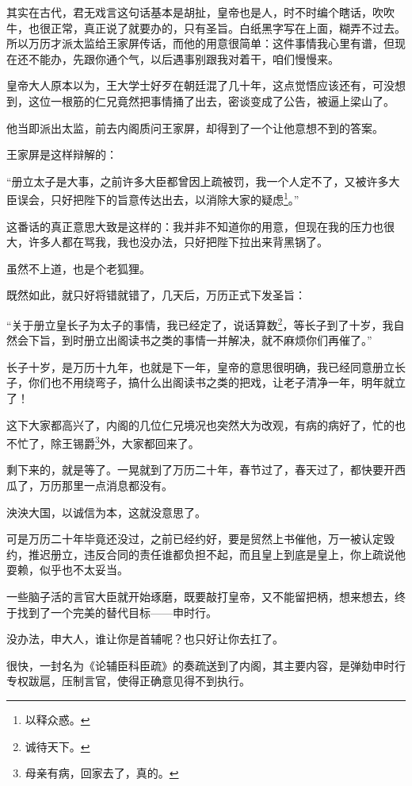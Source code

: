 \begin{multicols}{\theparacolNo}
		其实在古代，君无戏言这句话基本是胡扯，皇帝也是人，时不时编个瞎话，吹吹牛，也很正常，真正说了就要办的，只有圣旨。白纸黑字写在上面，糊弄不过去。所以万历才派太监给王家屏传话，而他的用意很简单：这件事情我心里有谱，但现在还不能办，先跟你通个气，以后遇事别跟我对着干，咱们慢慢来。

		皇帝大人原本以为，王大学士好歹在朝廷混了几十年，这点觉悟应该还有，可没想到，这位一根筋的仁兄竟然把事情捅了出去，密谈变成了公告，被逼上梁山了。

		他当即派出太监，前去内阁质问王家屏，却得到了一个让他意想不到的答案。

		王家屏是这样辩解的：

		“册立太子是大事，之前许多大臣都曾因上疏被罚，我一个人定不了，又被许多大臣误会，只好把陛下的旨意传达出去，以消除大家的疑虑\footnote{以释众惑。}。”

		这番话的真正意思大致是这样的：我并非不知道你的用意，但现在我的压力也很大，许多人都在骂我，我也没办法，只好把陛下拉出来背黑锅了。

		虽然不上道，也是个老狐狸。

		既然如此，就只好将错就错了，几天后，万历正式下发圣旨：

		“关于册立皇长子为太子的事情，我已经定了，说话算数\footnote{诚待天下。}，等长子到了十岁，我自然会下旨，到时册立出阁读书之类的事情一并解决，就不麻烦你们再催了。”

		长子十岁，是万历十九年，也就是下一年，皇帝的意思很明确，我已经同意册立长子，你们也不用绕弯子，搞什么出阁读书之类的把戏，让老子清净一年，明年就立了！

		这下大家都高兴了，内阁的几位仁兄境况也突然大为改观，有病的病好了，忙的也不忙了，除王锡爵\footnote{母亲有病，回家去了，真的。}外，大家都回来了。

		剩下来的，就是等了。一晃就到了万历二十年，春节过了，春天过了，都快要开西瓜了，万历那里一点消息都没有。

		泱泱大国，以诚信为本，这就没意思了。

		可是万历二十年毕竟还没过，之前已经约好，要是贸然上书催他，万一被认定毁约，推迟册立，违反合同的责任谁都负担不起，而且皇上到底是皇上，你上疏说他耍赖，似乎也不太妥当。

		一些脑子活的言官大臣就开始琢磨，既要敲打皇帝，又不能留把柄，想来想去，终于找到了一个完美的替代目标——申时行。

		没办法，申大人，谁让你是首辅呢？也只好让你去扛了。

		很快，一封名为《论辅臣科臣疏》的奏疏送到了内阁，其主要内容，是弹劾申时行专权跋扈，压制言官，使得正确意见得不到执行。


\end{multicols}
